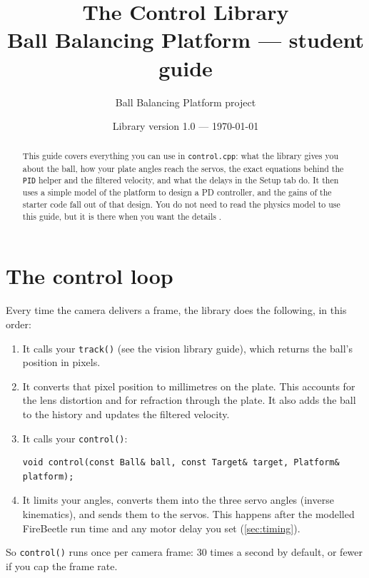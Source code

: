 \documentclass[10pt,a4paper]{article}
\title{The Control Library\\[2pt]\large Ball Balancing Platform --- student guide}
\author{Ball Balancing Platform project}
\date{Library version 1.0 --- \today}
\begin{document}
\maketitle

\begin{abstract}
This guide covers everything you can use in \texttt{control.cpp}: what the library gives you
about the ball, how your plate angles reach the servos, the exact equations behind the
\texttt{PID} helper and the filtered velocity, and what the delays in the Setup tab do. It then
uses a simple model of the platform to design a PD controller, and the gains of the starter
code fall out of that design. You do not need to read the physics model to use this guide, but
it is there when you want the details \citep{bbpphysics}.
\end{abstract}

\tableofcontents

\section{The control loop}
Every time the camera delivers a frame, the library does the following, in this order:
\begin{enumerate}
  \item It calls your \texttt{track()} (see the vision library guide), which returns the ball's
        position in pixels.
  \item It converts that pixel position to millimetres on the plate. This accounts for the lens
        distortion and for refraction through the plate. It also adds the ball to the history
        and updates the filtered velocity.
  \item It calls your \texttt{control()}:
\begin{lstlisting}
void control(const Ball& ball, const Target& target, Platform& platform);
\end{lstlisting}
  \item It limits your angles, converts them into the three servo angles (inverse kinematics),
        and sends them to the servos. This happens after the modelled FireBeetle run time and
        any motor delay you set (\cref{sec:timing}).
\end{enumerate}
So \texttt{control()} runs once per camera frame: $30$ times a second by default, or fewer if
you cap the frame rate.
\end{document}
